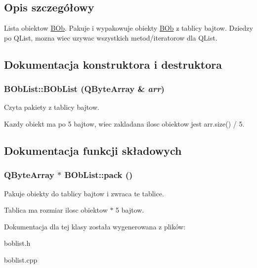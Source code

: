 \subsection{Opis szczegółowy}
Lista obiektow \hyperlink{class_b_ob}{BOb}. Pakuje i wypakowuje obiekty \hyperlink{class_b_ob}{BOb} z tablicy bajtow. Dziedzy po QList, mozna wiec uzywac wszystkich metod/iteratorow dla QList. 

\subsection{Dokumentacja konstruktora i destruktora}
\hypertarget{class_b_ob_list_af7a55be345796f510a836c0696513f6e}{
\subsubsection[{BObList}]{\setlength{\rightskip}{0pt plus 5cm}BObList::BObList (QByteArray \& {\em arr})}}
\label{class_b_ob_list_af7a55be345796f510a836c0696513f6e}


Czyta pakiety z tablicy bajtow. 

Kazdy obiekt ma po 5 bajtow, wiec zakladana ilosc obiektow jest arr.size() / 5. 

\subsection{Dokumentacja funkcji składowych}
\hypertarget{class_b_ob_list_adfa68bde6e6c3c6641735fb552a76d80}{
\subsubsection[{pack}]{\setlength{\rightskip}{0pt plus 5cm}QByteArray $\ast$ BObList::pack ()}}
\label{class_b_ob_list_adfa68bde6e6c3c6641735fb552a76d80}


Pakuje obiekty do tablicy bajtow i zwraca te tablice. 

Tablica ma rozmiar ilosc obiektow $\ast$ 5 bajtow. 

Dokumentacja dla tej klasy została wygenerowana z plików:\begin{DoxyCompactItemize}
\item 
boblist.h\item 
boblist.cpp\end{DoxyCompactItemize}
